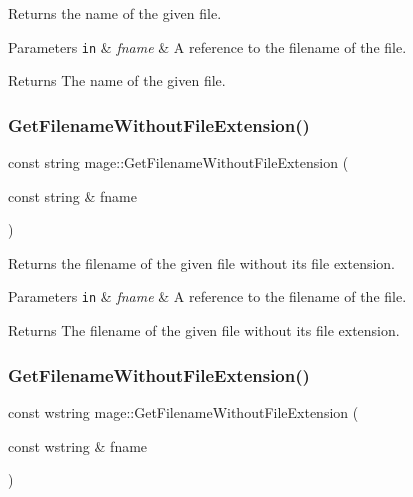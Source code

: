 Returns the name of the given file.


\begin{DoxyParams}[1]{Parameters}
\mbox{\tt in}  & {\em fname} & A reference to the filename of the file. \\
\hline
\end{DoxyParams}
\begin{DoxyReturn}{Returns}
The name of the given file. 
\end{DoxyReturn}
\hypertarget{namespacemage_ab8841cbab507ef81edb00278110553ad}{}\label{namespacemage_ab8841cbab507ef81edb00278110553ad} 
\subsubsection{\texorpdfstring{Get\+Filename\+Without\+File\+Extension()}{GetFilenameWithoutFileExtension()}\hspace{0.1cm}{\footnotesize\ttfamily [1/2]}}
{\footnotesize\ttfamily const string mage\+::\+Get\+Filename\+Without\+File\+Extension (\begin{DoxyParamCaption}\item[{const string \&}]{fname }\end{DoxyParamCaption})}

Returns the filename of the given file without its file extension.


\begin{DoxyParams}[1]{Parameters}
\mbox{\tt in}  & {\em fname} & A reference to the filename of the file. \\
\hline
\end{DoxyParams}
\begin{DoxyReturn}{Returns}
The filename of the given file without its file extension. 
\end{DoxyReturn}
\hypertarget{namespacemage_aac01c0fba57d6737fcf32155748e95b0}{}\label{namespacemage_aac01c0fba57d6737fcf32155748e95b0} 
\subsubsection{\texorpdfstring{Get\+Filename\+Without\+File\+Extension()}{GetFilenameWithoutFileExtension()}\hspace{0.1cm}{\footnotesize\ttfamily [2/2]}}
{\footnotesize\ttfamily const wstring mage\+::\+Get\+Filename\+Without\+File\+Extension (\begin{DoxyParamCaption}\item[{const wstring \&}]{fname }\end{DoxyParamCaption})}


